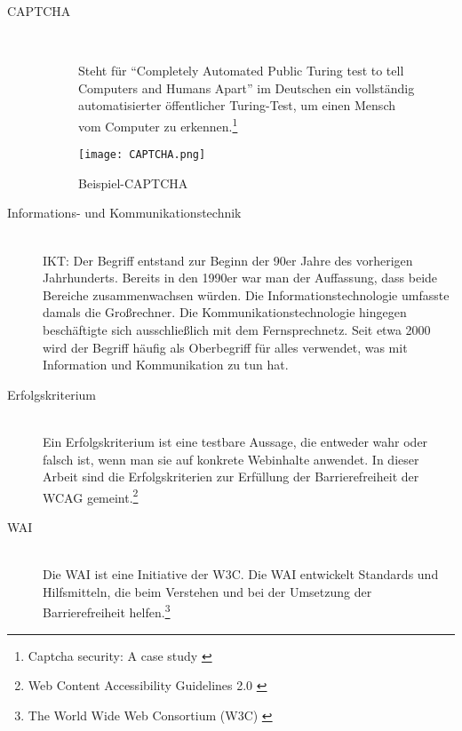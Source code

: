 \begin{description}
	\item[CAPTCHA]\hfill \\
	\begin{figure}[h]
		\begin{minipage}{0.5\textwidth}
			Steht für "`Completely Automated Public Turing test to tell Computers and Humans Apart"' im Deutschen ein vollständig automatisierter öffentlicher
			Turing-Test, um einen Mensch vom Computer zu erkennen.\footnote{Captcha security: A case study \cite{yan2009captcha}}
		\end{minipage}
		\hfill
		\begin{minipage}{0.4\textwidth}
			\texttt{[image: CAPTCHA.png]}
			\caption{Beispiel-CAPTCHA \cite{yan2009captcha}}
		\end{minipage}
	\end{figure}

	\item[Informations- und Kommunikationstechnik]\hfill \\
	\ac{IKT}: Der Begriff entstand zur Beginn der 90er Jahre des vorherigen Jahrhunderts. Bereits in den 1990er war man der Auffassung, dass beide
	Bereiche zusammenwachsen würden. Die Informationstechnologie umfasste damals die Großrechner. Die Kommunikationstechnologie hingegen beschäftigte
	sich ausschließlich mit dem Fernsprechnetz. Seit etwa 2000 wird der Begriff häufig als Oberbegriff für alles verwendet, was mit Information und Kommunikation
	zu tun hat.
	\\

	\item [Erfolgskriterium]\hfill \\
	Ein Erfolgskriterium ist eine testbare Aussage, die entweder wahr oder falsch ist, wenn man sie auf konkrete Webinhalte anwendet. In dieser
	Arbeit sind die Erfolgskriterien zur Erfüllung der Barrierefreiheit der \ac{WCAG} gemeint.\footnote{Web Content Accessibility Guidelines 2.0 \cite{WCAG2.0}}

	\item[\ac{WAI}]\hfill \\	
	Die \ac{WAI} ist eine Initiative der \ac{W3C}. Die \ac{WAI} entwickelt Standards und Hilfsmitteln, die beim Verstehen und bei der Umsetzung 
	der Barrierefreiheit helfen.\footnote{The World Wide Web Consortium (W3C) \cite{w3c}}


\end{description}
